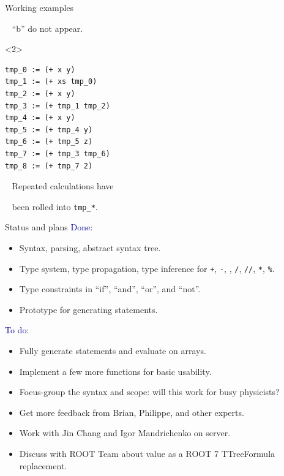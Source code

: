 \documentclass{beamer}
\begin{document}
\begin{frame}[fragile]{Working examples}
\begin{minipage}[t][12cm][t]{\textwidth}
\begin{onlyenv}
\mbox{ } \hfill ``b'' do not appear.

\vspace{6 cm}
\end{onlyenv}
\begin{onlyenv}<2>
\begin{lstlisting}[basicstyle=\ttfamily\small]
tmp_0 := (+ x y)
tmp_1 := (+ xs tmp_0)
tmp_2 := (+ x y)
tmp_3 := (+ tmp_1 tmp_2)
tmp_4 := (+ x y)
tmp_5 := (+ tmp_4 y)
tmp_6 := (+ tmp_5 z)
tmp_7 := (+ tmp_3 tmp_6)
tmp_8 := (+ tmp_7 2)
\end{lstlisting}
\vspace{-3.7 cm}
\normalsize
\mbox{ } \hfill Repeated calculations have

\mbox{ } \hfill been rolled into {\tt\small tmp\_*}.

\vspace{3.7 cm}
\end{onlyenv}
\end{minipage}
\end{frame}

\begin{frame}{Status and plans}
\vspace{0.3 cm}
\textcolor{darkblue}{Done:}
\begin{itemize}
\item Syntax, parsing, abstract syntax tree.
\item Type system, type propagation, type inference for {\tt +}, {\tt -}, {\tt *}, {\tt /}, {\tt //}, {\tt **}, {\tt \%}.
\item Type constraints in ``if'', ``and'', ``or'', and ``not''.
\item Prototype for generating statements.
\end{itemize}

\vfill
\textcolor{darkblue}{To do:}
\begin{itemize}
\item Fully generate statements and evaluate on arrays.
\item Implement a few more functions for basic usability.
\item Focus-group the syntax and scope: will this work for busy physicists?
\item Get more feedback from Brian, Philippe, and other experts.
\item Work with Jin Chang and Igor Mandrichenko on server.
\item Discuss with ROOT Team about value as a ROOT 7 TTreeFormula replacement.
\end{itemize}
\end{frame}
\end{document}
